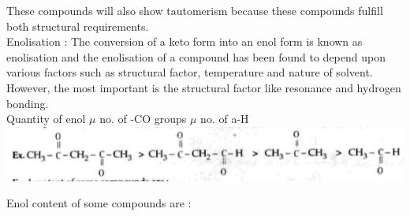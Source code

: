 \documentclass[10pt]{article}
\begin{document}
These compounds will also show tautomerism because these compounds fulfill both structural requirements.\\
Enolisation : The conversion of a keto form into an enol form is known as enolisation and the enolisation of a compound has been found to depend upon various factors such as structural factor, temperature and nature of solvent. However, the most important is the structural factor like resonance and hydrogen bonding.\\
Quantity of enol $\mu$ no. of -CO groups $\mu$ no. of a-H\\
\includegraphics[max width=\textwidth, center]{2025_01_28_8470952b98110cec3aabg-043(1)}

Enol content of some compounds are :
\end{document}
